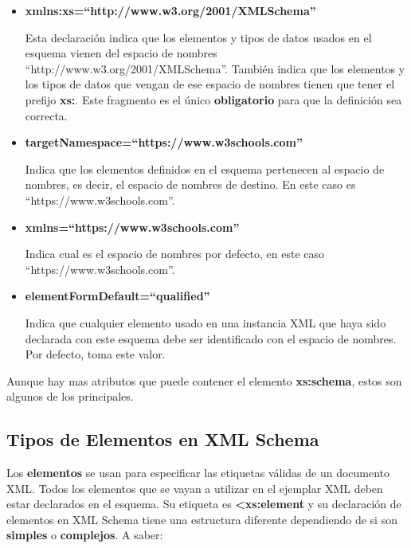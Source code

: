 \begin{itemize}
    \item \textbf{xmlns:xs=``http://www.w3.org/2001/XMLSchema''}

    Esta declaración indica que los elementos y tipos de datos usados en el esquema vienen del espacio de nombres ``http://www.w3.org/2001/XMLSchema''. También indica que los elementos y los tipos de datos que vengan de ese espacio de nombres tienen que tener el prefijo \textbf{xs:}. Este fragmento es el único \textbf{obligatorio} para que la definición sea correcta.

    \item \textbf{targetNamespace=``https://www.w3schools.com''}

    Indica que los elementos definidos en el esquema pertenecen al espacio de nombres, es decir, el espacio de nombres de destino. En este caso es ``https://www.w3schools.com''.

    \item \textbf{xmlns=``https://www.w3schools.com''}

    Indica cual es el espacio de nombres por defecto, en este caso ``https://www.w3schools.com''.

    \item \textbf{elementFormDefault=``qualified''}

    Indica que cualquier elemento usado en una instancia XML que haya sido declarada con este esquema debe ser identificado con el espacio de nombres. Por defecto, toma este valor.
\end{itemize}

Aunque hay mas atributos que puede contener el elemento \textbf{xs:schema}, estos son algunos de los principales.

\subsection{Tipos de Elementos en XML Schema}
Los \textbf{elementos} se usan para especificar las etiquetas válidas de un documento XML. Todos los elementos que se vayan a utilizar en el ejemplar XML deben estar declarados en el esquema. Su etiqueta es \textbf{<xs:element} y su declaración de elementos en XML Schema tiene una estructura diferente dependiendo de si son \textbf{simples} o \textbf{complejos}. A saber:

